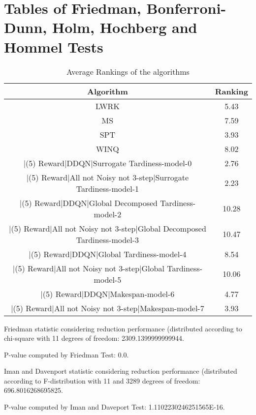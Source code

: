 \documentclass[a3paper,10pt]{article}
\author{}
\date{\today}
\begin{document}
\oddsidemargin 0in \topmargin 0in\maketitle
\section{Tables of Friedman, Bonferroni-Dunn, Holm, Hochberg and Hommel Tests}
\begin{table}[!htp]
\centering
\caption{Average Rankings of the algorithms
}\begin{tabular}{c|c}
Algorithm&Ranking\\
\hline
LWRK&5.43\\
MS&7.59\\
SPT&3.93\\
WINQ&8.02\\
|(5) Reward|DDQN|Surrogate Tardiness-model-0&2.76\\
|(5) Reward|All not Noisy not 3-step|Surrogate Tardiness-model-1&2.23\\
|(5) Reward|DDQN|Global Decomposed Tardiness-model-2&10.28\\
|(5) Reward|All not Noisy not 3-step|Global Decomposed Tardiness-model-3&10.47\\
|(5) Reward|DDQN|Global Tardiness-model-4&8.54\\
|(5) Reward|All not Noisy not 3-step|Global Tardiness-model-5&10.06\\
|(5) Reward|DDQN|Makespan-model-6&4.77\\
|(5) Reward|All not Noisy not 3-step|Makespan-model-7&3.93\\
\end{tabular}
\end{table}


Friedman statistic considering reduction performance (distributed according to chi-square with 11 degrees of freedom: 2309.1399999999944.


P-value computed by Friedman Test: 0.0.\newline

Iman and Davenport statistic considering reduction performance (distributed according to F-distribution with 11 and 3289 degrees of freedom: 696.8016268695825.


P-value computed by Iman and Daveport Test: 1.1102230246251565E-16.\newline
\end{document}
